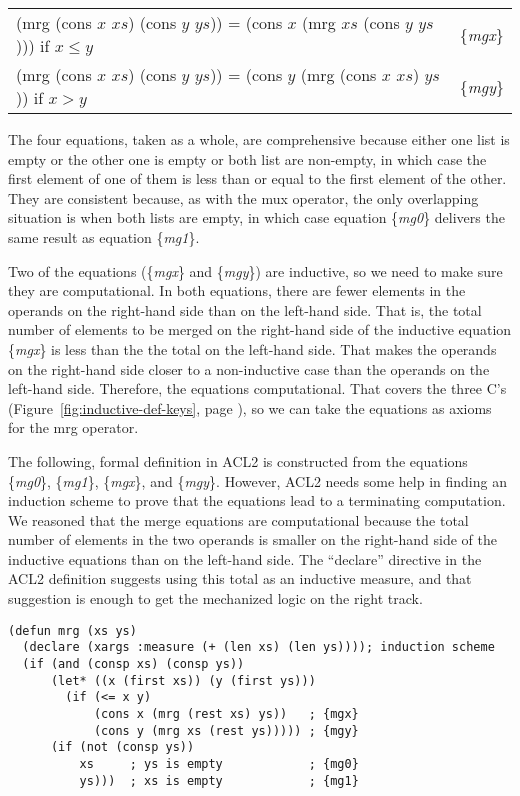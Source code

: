 \begin{center}
\begin{tabular}{ll}
(mrg (cons $x$ $xs$) (cons $y$ $ys$)) = (cons $x$ (mrg $xs$ (cons $y$ $ys$))) if $x \le y$ & \{\emph{mgx}\} \\
(mrg (cons $x$ $xs$) (cons $y$ $ys$)) = (cons $y$ (mrg (cons $x$ $xs$) $ys$)) if $x > y$   & \{\emph{mgy}\} \\
\end{tabular}
\end{center}

The four equations, taken as a whole, are comprehensive
because either one list is empty or the other one is empty
or both list are non-empty, in which case the first element of one of them
is less than or equal to the first element of the other.
They are consistent because, as with the mux operator, the only overlapping situation is when
both lists are empty, in which case equation \{\emph{mg0}\}
delivers the same result as equation \{\emph{mg1}\}.

Two of the equations (\{\emph{mgx}\} and \{\emph{mgy}\}) are inductive,
so we need to make sure they are computational.
In both equations, there are fewer elements in the operands
on the right-hand side than on the left-hand side.
That is, the total number of elements to be merged
on the right-hand side of the inductive equation \{\emph{mgx}\}
is less than the the total on the left-hand side.
That makes the operands on the right-hand side closer to
a non-inductive case than the operands on the left-hand side.
Therefore, the equations computational.
That covers the three C's
(Figure~\ref{fig:inductive-def-keys}, page \pageref{fig:inductive-def-keys}),
so we can take the equations as axioms for the mrg operator.

The following, formal definition in ACL2 is constructed from
the equations \{\emph{mg0}\}, \{\emph{mg1}\}, \{\emph{mgx}\}, and \{\emph{mgy}\}.
However, ACL2 needs some help in finding an induction scheme
to prove that the equations lead to a terminating computation.
We reasoned that the merge equations are computational
because the total number of elements in the two operands
is smaller on the right-hand side of the inductive equations
than on the left-hand side.
The ``declare'' directive in the ACL2 definition suggests using
this total as an inductive measure,
and that suggestion is enough to get the mechanized logic on the right track.

\label{defun:mrg}
\begin{Verbatim}
(defun mrg (xs ys)
  (declare (xargs :measure (+ (len xs) (len ys)))); induction scheme
  (if (and (consp xs) (consp ys))
      (let* ((x (first xs)) (y (first ys)))
        (if (<= x y)
            (cons x (mrg (rest xs) ys))   ; {mgx}
            (cons y (mrg xs (rest ys))))) ; {mgy}
      (if (not (consp ys))
          xs     ; ys is empty            ; {mg0}
          ys)))  ; xs is empty            ; {mg1}
\end{Verbatim}

